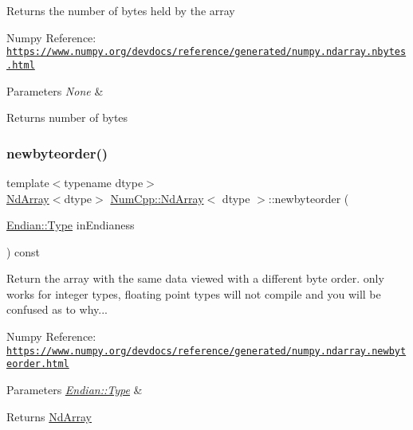 Returns the number of bytes held by the array

Numpy Reference\+: \href{https://www.numpy.org/devdocs/reference/generated/numpy.ndarray.nbytes.html}{\tt https\+://www.\+numpy.\+org/devdocs/reference/generated/numpy.\+ndarray.\+nbytes.\+html}


\begin{DoxyParams}{Parameters}
{\em None} & \\
\hline
\end{DoxyParams}
\begin{DoxyReturn}{Returns}
number of bytes 
\end{DoxyReturn}
\mbox{\label{class_num_cpp_1_1_nd_array_a206fe78f40f2ba05babcddc00a55258a}} 
\subsubsection{\texorpdfstring{newbyteorder()}{newbyteorder()}}
{\footnotesize\ttfamily template$<$typename dtype$>$ \\
\mbox{\hyperlink{class_num_cpp_1_1_nd_array}{Nd\+Array}}$<$dtype$>$ \mbox{\hyperlink{class_num_cpp_1_1_nd_array}{Num\+Cpp\+::\+Nd\+Array}}$<$ dtype $>$\+::newbyteorder (\begin{DoxyParamCaption}\item[{\mbox{\hyperlink{struct_num_cpp_1_1_endian_a4b4f3e02f68302be202402f5d5501445}{Endian\+::\+Type}}}]{in\+Endianess }\end{DoxyParamCaption}) const\hspace{0.3cm}{\ttfamily [inline]}}

Return the array with the same data viewed with a different byte order. only works for integer types, floating point types will not compile and you will be confused as to why...

Numpy Reference\+: \href{https://www.numpy.org/devdocs/reference/generated/numpy.ndarray.newbyteorder.html}{\tt https\+://www.\+numpy.\+org/devdocs/reference/generated/numpy.\+ndarray.\+newbyteorder.\+html}


\begin{DoxyParams}{Parameters}
{\em \mbox{\hyperlink{struct_num_cpp_1_1_endian_a4b4f3e02f68302be202402f5d5501445}{Endian\+::\+Type}}} & \\
\hline
\end{DoxyParams}
\begin{DoxyReturn}{Returns}
\mbox{\hyperlink{class_num_cpp_1_1_nd_array}{Nd\+Array}} 
\end{DoxyReturn}
\mbox{\label{class_num_cpp_1_1_nd_array_af89d5c6a51185acc64afdfff66f0d786}} 
